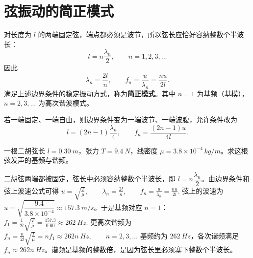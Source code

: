 
\section{弦振动的简正模式}

\begin{definition}[简正模式]
对长度为 \(l\) 的两端固定弦，端点都必须是波节，所以弦长应恰好容纳整数个半波长：
\[
l=n\frac{\lambda_n}{2},\qquad n=1,2,3,\dots
\]
因此
\[
\lambda_n=\frac{2l}{n},\qquad f_n=\frac{u}{\lambda_n}=\frac{nu}{2l}.
\]
满足上述边界条件的稳定振动方式，称为\textbf{简正模式}。其中 \(n=1\) 为基频（基模），\(n=2,3,\dots\) 为高次谐波模式。

若一端固定、一端自由，则边界条件变为一端波节、一端波腹，允许条件改为
\[
l=(2n-1)\frac{\lambda_n}{4},\qquad f_n=\frac{(2n-1)u}{4l}.
\]
\end{definition}


\begin{exercise}[二胡弦的基频和谐频怎样由边界条件决定]
一根二胡弦长 \(l=\SI{0.30}{m}\)，张力 \(T=\SI{9.4}{N}\)，线密度 \(\mu=3.8\times10^{-4}\,\si{kg/m}\)。求这根弦发声的基频与谐频。
\end{exercise}

\begin{solution}
二胡弦两端都被固定，弦长中必须容纳整数个半波长，即 \(l=n\dfrac{\lambda_n}{2}\)。由边界条件和弦上波速公式可得
 \(u=\sqrt{\frac{T}{\mu}},\qquad \lambda_n=\frac{2l}{n},\qquad f_n=\frac{u}{\lambda_n}=\frac{nu}{2l}.\) 
弦上的波速为 \(u=\sqrt{\dfrac{9.4}{3.8\times10^{-4}}}\approx \SI{157.3}{m/s}\)。于是基频对应 \(n=1\)：
 \(f_1=\frac{1}{2l}\sqrt{\frac{T}{\mu}} =\frac{157.3}{0.60} \approx \SI{262}{Hz}.\) 
更高次谐频为
 \(f_n=\frac{n}{2l}\sqrt{\frac{T}{\mu}} =n f_1 \approx 262n\ \si{Hz},\qquad n=2,3,\dots\) 
基频约为 \(\SI{262}{Hz}\)，各次谐频满足 \(f_n\approx 262n\ \si{Hz}\)。谐频是基频的整数倍，是因为弦长里必须塞下整数个半波长。
\end{solution}
